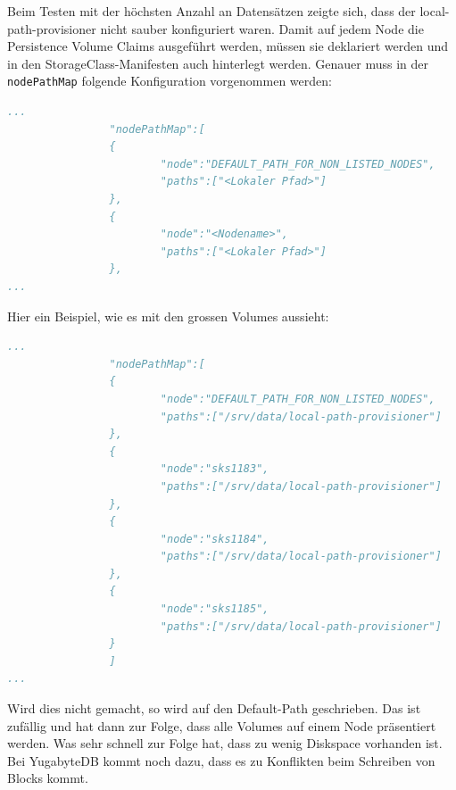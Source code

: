 \begin{flushleft}
    Beim Testen mit der höchsten Anzahl an Datensätzen zeigte sich, dass der \gls{local-path-provisioner} nicht sauber konfiguriert waren.
    Damit auf jedem Node die Persistence Volume Claims ausgeführt werden, müssen sie deklariert werden und in den StorageClass-Manifesten auch hinterlegt werden.
    Genauer muss in der \texttt{nodePathMap} folgende Konfiguration vorgenommen werden:
\lstset{style=gra_codestyle}
\begin{lstlisting}[language=yaml, caption=local-path-provisioner nodePathMap,captionpos=b,label={lst:local-path-provisioner_nodePathMap},breaklines=true]
...
                "nodePathMap":[
                {
                        "node":"DEFAULT_PATH_FOR_NON_LISTED_NODES",
                        "paths":["<Lokaler Pfad>"]
                },
                {
                        "node":"<Nodename>",
                        "paths":["<Lokaler Pfad>"]
                },
...
\end{lstlisting}
    Hier ein Beispiel, wie es mit den grossen Volumes aussieht:
\lstset{style=gra_codestyle}
\begin{lstlisting}[language=yaml, caption=local-path-provisioner nodePathMap Beispiel,captionpos=b,label={lst:local-path-provisioner_nodePathMap-exampl},breaklines=true]
...
                "nodePathMap":[
                {
                        "node":"DEFAULT_PATH_FOR_NON_LISTED_NODES",
                        "paths":["/srv/data/local-path-provisioner"]
                },
                {
                        "node":"sks1183",
                        "paths":["/srv/data/local-path-provisioner"]
                },
                {
                        "node":"sks1184",
                        "paths":["/srv/data/local-path-provisioner"]
                },
                {
                        "node":"sks1185",
                        "paths":["/srv/data/local-path-provisioner"]
                }
                ]
...
\end{lstlisting}
    Wird dies nicht gemacht, so wird auf den Default-Path geschrieben.
    Das ist zufällig und hat dann zur Folge, dass alle Volumes auf einem Node präsentiert werden.
    Was sehr schnell zur Folge hat, dass zu wenig Diskspace vorhanden ist.
    Bei YugabyteDB kommt noch dazu, dass es zu Konflikten beim Schreiben von Blocks kommt.
\end{flushleft}

